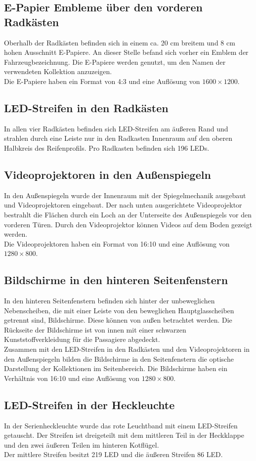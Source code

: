 \subsection{E-Papier Embleme über den vorderen Radkästen}
Oberhalb der Radkästen befinden sich in einem ca. 20 cm breitem und 8 cm hohen Ausschnitt E-Papiere. An dieser Stelle befand sich vorher ein Emblem der Fahrzeugbezeichnung.
Die E-Papiere werden genutzt, um den Namen der verwendeten Kollektion anzuzeigen. \\
Die E-Papiere haben ein Format von 4:3 und eine Auflösung von $ 1600\times1200 $.
\subsection{LED-Streifen in den Radkästen}
In allen vier Radkästen befinden sich LED-Streifen am äußeren Rand und strahlen durch eine Leiste nur in den Radkasten Innenraum auf den oberen Halbkreis des Reifenprofils. 
Pro Radkasten befinden sich 196 LEDs. 
\subsection{Videoprojektoren in den Außenspiegeln}
In den Außenspiegeln wurde der Innenraum mit der Spiegelmechanik ausgebaut und Videoprojektoren eingebaut. Der nach unten ausgerichtete Videoprojektor bestrahlt die Flächen durch ein Loch an der Unterseite des Außenspiegels vor den vorderen Türen.
Durch den Videoprojektor können Videos auf dem Boden gezeigt werden.\\
Die Videoprojektoren haben ein Format von 16:10 und eine Auflösung von $ 1280\times800 $.
\subsection{Bildschirme in den hinteren Seitenfenstern}
In den hinteren Seitenfenstern befinden sich hinter der unbeweglichen Nebenscheiben, die mit einer Leiste von den beweglichen Hauptglasscheiben getrennt sind, Bildschirme. Diese können von außen betrachtet werden. Die Rückseite der Bildschirme ist von innen mit einer schwarzen Kunststoffverkleidung für die Passagiere abgedeckt.\\
Zusammen mit den LED-Streifen in den Radkästen und den Videoprojektoren in den Außenspiegeln bilden die Bildschirme in den Seitenfenstern die optische Darstellung der Kollektionen im Seitenbereich.
Die Bildschirme haben ein Verhältnis von 16:10 und eine Auflösung von $ 1280\times800 $.
\subsection{LED-Streifen in der Heckleuchte}
In der Serienheckleuchte wurde das rote Leuchtband mit einem LED-Streifen getauscht. Der Streifen ist dreigeteilt mit dem mittleren Teil in der Heckklappe und den zwei äußeren Teilen im hinteren Kotflügel. \\
Der mittlere Streifen besitzt 219 LED und die äußeren Streifen 86 LED.
